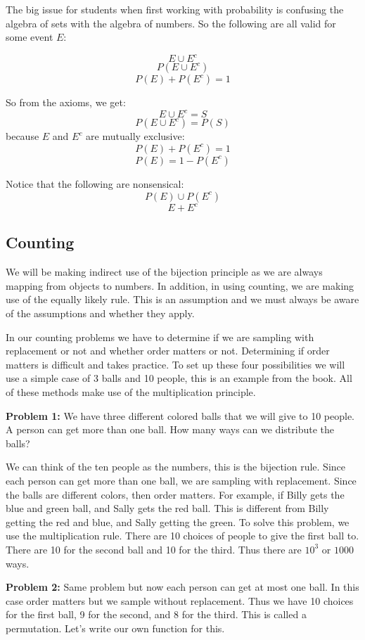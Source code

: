 \documentclass[]{book}
\theoremstyle{definition}
\theoremstyle{definition}
\theoremstyle{definition}
\theoremstyle{remark}
\begin{document}
The big issue for students when first working with probability is
confusing the algebra of sets with the algebra of numbers. So the
following are all valid for some event \(E\):

\[ E \cup E^c  \] \[P(E \cup E^c)\] \[P(E)+P(E^c)=1\]

So from the axioms, we get: \[E \cup E^c = S \] \[P(E \cup E^c)=P(S)\]
because \(E\) and \(E^c\) are mutually exclusive: \[P(E)+P(E^c)=1\]
\[P(E)=1-P(E^c)\]

Notice that the following are nonsensical: \[P(E) \cup P(E^c)\]
\[E + E^c\]

\subsection{Counting}\label{counting}

We will be making indirect use of the bijection principle as we are
always mapping from objects to numbers. In addition, in using counting,
we are making use of the equally likely rule. This is an assumption and
we must always be aware of the assumptions and whether they apply.

In our counting problems we have to determine if we are sampling with
replacement or not and whether order matters or not. Determining if
order matters is difficult and takes practice. To set up these four
possibilities we will use a simple case of 3 balls and 10 people, this
is an example from the book. All of these methods make use of the
multiplication principle.

\textbf{Problem 1:} We have three different colored balls that we will
give to 10 people. A person can get more than one ball. How many ways
can we distribute the balls?

We can think of the ten people as the numbers, this is the bijection
rule. Since each person can get more than one ball, we are sampling with
replacement. Since the balls are different colors, then order matters.
For example, if Billy gets the blue and green ball, and Sally gets the
red ball. This is different from Billy getting the red and blue, and
Sally getting the green. To solve this problem, we use the
multiplication rule. There are 10 choices of people to give the first
ball to. There are 10 for the second ball and 10 for the third. Thus
there are \(10^3\) or \(1000\) ways.

\textbf{Problem 2:} Same problem but now each person can get at most one
ball. In this case order matters but we sample without replacement. Thus
we have 10 choices for the first ball, 9 for the second, and 8 for the
third. This is called a permutation. Let's write our own function for
this.
\end{document}
